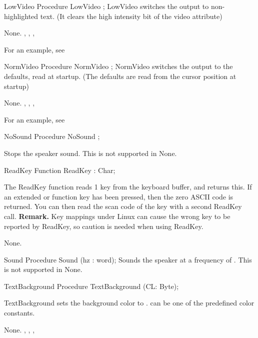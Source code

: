  
\begin{procedure}{LowVideo}
\Declaration
Procedure LowVideo ;
\Description
 LowVideo switches the output to non-highlighted text. (It clears the high
intensity bit of the video attribute)

\Errors
None.
\SeeAlso
 , , ,
\end{procedure}
For an example, see 
\begin{procedure}{NormVideo}
\Declaration
Procedure NormVideo ;
\Description
 NormVideo switches the output to the defaults, read at startup. (The
defaults are read from the cursor position at startup)

\Errors
None.
\SeeAlso
 , , ,
\end{procedure}
For an example, see 
\begin{procedure}{NoSound}
\Declaration
Procedure NoSound ;
\Description

Stops the speaker sound.
This is not supported in \linux
\Errors
None.
\SeeAlso
{}
\end{procedure}

 
\begin{function}{ReadKey}
\Declaration
Function ReadKey  : Char;
\Description

The ReadKey function reads 1 key from the keyboard buffer, and returns this.
If an extended or function key has been pressed, then the zero ASCII code is 
returned. You can then read the scan code of the key with a second ReadKey
call.
\textbf{Remark.} Key mappings under Linux can cause the wrong key to be
reported by ReadKey, so caution is needed when using ReadKey.  

\Errors
None.
\SeeAlso
{}
\end{function}




\begin{procedure}{Sound}
\Declaration
Procedure Sound (hz : word);
\Description
 Sounds the speaker at a frequency of .
This is not supported in \linux
\Errors
None.
\SeeAlso
{}
\end{procedure}

\begin{procedure}{TextBackground}
\Declaration
Procedure TextBackground (CL: Byte);
\Description

TextBackground sets the background color to .  can be one of the
predefined color constants.

\Errors
None.
\SeeAlso
 , , ,
\end{procedure}

